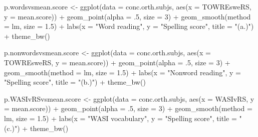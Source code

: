 \documentclass[
  letterpaper,
  DIV=11,
  numbers=noendperiod]{scrreprt}
\newenvironment{Shaded}{\begin{snugshade}}{\end{snugshade}}
\newcommand{\AttributeTok}[1]{\textcolor[rgb]{0.40,0.45,0.13}{#1}}
\newcommand{\DecValTok}[1]{\textcolor[rgb]{0.68,0.00,0.00}{#1}}
\newcommand{\FloatTok}[1]{\textcolor[rgb]{0.68,0.00,0.00}{#1}}
\newcommand{\FunctionTok}[1]{\textcolor[rgb]{0.28,0.35,0.67}{#1}}
\newcommand{\NormalTok}[1]{\textcolor[rgb]{0.00,0.23,0.31}{#1}}
\newcommand{\OtherTok}[1]{\textcolor[rgb]{0.00,0.23,0.31}{#1}}
\newcommand{\SpecialCharTok}[1]{\textcolor[rgb]{0.37,0.37,0.37}{#1}}
\newcommand{\StringTok}[1]{\textcolor[rgb]{0.13,0.47,0.30}{#1}}
\begin{document}
\begin{Shaded}
\begin{Highlighting}[]
\NormalTok{p.wordsvsmean.score }\OtherTok{\textless{}{-}} \FunctionTok{ggplot}\NormalTok{(}\AttributeTok{data =}\NormalTok{ conc.orth.subjs, }
                              \FunctionTok{aes}\NormalTok{(}\AttributeTok{x =}\NormalTok{ TOWREsweRS, }
                              \AttributeTok{y =}\NormalTok{ mean.score)) }\SpecialCharTok{+}
  \FunctionTok{geom\_point}\NormalTok{(}\AttributeTok{alpha =}\NormalTok{ .}\DecValTok{5}\NormalTok{, }\AttributeTok{size =} \DecValTok{3}\NormalTok{) }\SpecialCharTok{+}
  \FunctionTok{geom\_smooth}\NormalTok{(}\AttributeTok{method =} \StringTok{\textquotesingle{}lm\textquotesingle{}}\NormalTok{, }\AttributeTok{size =} \FloatTok{1.5}\NormalTok{) }\SpecialCharTok{+}
  \FunctionTok{labs}\NormalTok{(}\AttributeTok{x =} \StringTok{"Word reading"}\NormalTok{, }
       \AttributeTok{y =} \StringTok{"Spelling score"}\NormalTok{,}
       \AttributeTok{title =} \StringTok{"(a.)"}\NormalTok{) }\SpecialCharTok{+}
  \FunctionTok{theme\_bw}\NormalTok{()}

\NormalTok{p.nonwordsvsmean.score }\OtherTok{\textless{}{-}} \FunctionTok{ggplot}\NormalTok{(}\AttributeTok{data =}\NormalTok{ conc.orth.subjs, }
                              \FunctionTok{aes}\NormalTok{(}\AttributeTok{x =}\NormalTok{ TOWREsweRS, }
                                  \AttributeTok{y =}\NormalTok{ mean.score)) }\SpecialCharTok{+}
  \FunctionTok{geom\_point}\NormalTok{(}\AttributeTok{alpha =}\NormalTok{ .}\DecValTok{5}\NormalTok{, }\AttributeTok{size =} \DecValTok{3}\NormalTok{) }\SpecialCharTok{+}
  \FunctionTok{geom\_smooth}\NormalTok{(}\AttributeTok{method =} \StringTok{\textquotesingle{}lm\textquotesingle{}}\NormalTok{, }\AttributeTok{size =} \FloatTok{1.5}\NormalTok{) }\SpecialCharTok{+}
  \FunctionTok{labs}\NormalTok{(}\AttributeTok{x =} \StringTok{"Nonword reading"}\NormalTok{, }
       \AttributeTok{y =} \StringTok{"Spelling score"}\NormalTok{,}
       \AttributeTok{title =} \StringTok{"(b.)"}\NormalTok{) }\SpecialCharTok{+}
  \FunctionTok{theme\_bw}\NormalTok{()}

\NormalTok{p.WASIvRSvsmean.score }\OtherTok{\textless{}{-}} \FunctionTok{ggplot}\NormalTok{(}\AttributeTok{data =}\NormalTok{ conc.orth.subjs, }
                              \FunctionTok{aes}\NormalTok{(}\AttributeTok{x =}\NormalTok{ WASIvRS, }
                                  \AttributeTok{y =}\NormalTok{ mean.score)) }\SpecialCharTok{+}
  \FunctionTok{geom\_point}\NormalTok{(}\AttributeTok{alpha =}\NormalTok{ .}\DecValTok{5}\NormalTok{, }\AttributeTok{size =} \DecValTok{3}\NormalTok{) }\SpecialCharTok{+}
  \FunctionTok{geom\_smooth}\NormalTok{(}\AttributeTok{method =} \StringTok{\textquotesingle{}lm\textquotesingle{}}\NormalTok{, }\AttributeTok{size =} \FloatTok{1.5}\NormalTok{) }\SpecialCharTok{+}
  \FunctionTok{labs}\NormalTok{(}\AttributeTok{x =} \StringTok{"WASI vocabulary"}\NormalTok{, }
       \AttributeTok{y =} \StringTok{"Spelling score"}\NormalTok{,}
       \AttributeTok{title =} \StringTok{"(c.)"}\NormalTok{) }\SpecialCharTok{+}
  \FunctionTok{theme\_bw}\NormalTok{()}


\end{Highlighting}
\end{Shaded}
\end{document}
